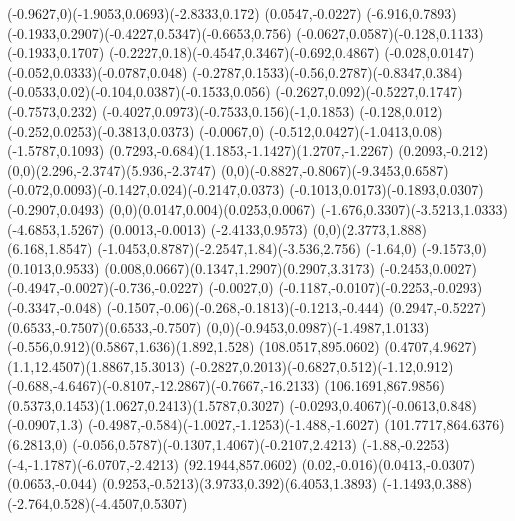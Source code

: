 {    \rcurveto(-0.9627,0)(-1.9053,0.0693)(-2.8333,0.172)
    \rlineto(0.0547,-0.0227)
    \rlineto(-6.916,0.7893)
    \rcurveto(-0.1933,0.2907)(-0.4227,0.5347)(-0.6653,0.756)
    \rcurveto(-0.0627,0.0587)(-0.128,0.1133)(-0.1933,0.1707)
    \rcurveto(-0.2227,0.18)(-0.4547,0.3467)(-0.692,0.4867)
    \rcurveto(-0.028,0.0147)(-0.052,0.0333)(-0.0787,0.048)
    \rcurveto(-0.2787,0.1533)(-0.56,0.2787)(-0.8347,0.384)
    \rcurveto(-0.0533,0.02)(-0.104,0.0387)(-0.1533,0.056)
    \rcurveto(-0.2627,0.092)(-0.5227,0.1747)(-0.7573,0.232)
    \rcurveto(-0.4027,0.0973)(-0.7533,0.156)(-1,0.1853)
    \rcurveto(-0.128,0.012)(-0.252,0.0253)(-0.3813,0.0373)
    \rlineto(-0.0067,0)
    \rcurveto(-0.512,0.0427)(-1.0413,0.08)(-1.5787,0.1093)
    \rcurveto(0.7293,-0.684)(1.1853,-1.1427)(1.2707,-1.2267)
    \rlineto(0.2093,-0.212)
    \rcurveto(0,0)(2.296,-2.3747)(5.936,-2.3747)
    \rcurveto(0,0)(-0.8827,-0.8067)(-9.3453,0.6587)
    \rcurveto(-0.072,0.0093)(-0.1427,0.024)(-0.2147,0.0373)
    \rcurveto(-0.1013,0.0173)(-0.1893,0.0307)(-0.2907,0.0493)
    \rcurveto(0,0)(0.0147,0.004)(0.0253,0.0067)
    \rcurveto(-1.676,0.3307)(-3.5213,1.0333)(-4.6853,1.5267)
    \rlineto(0.0013,-0.0013)
    \rlineto(-2.4133,0.9573)
    \rcurveto(0,0)(2.3773,1.888)(6.168,1.8547)
    \rcurveto(-1.0453,0.8787)(-2.2547,1.84)(-3.536,2.756)
    \rlineto(-1.64,0)
    \rlineto(-9.1573,0)
    \rlineto(0.1013,0.9533)
    \rcurveto(0.008,0.0667)(0.1347,1.2907)(0.2907,3.3173)
    \rcurveto(-0.2453,0.0027)(-0.4947,-0.0027)(-0.736,-0.0227)
    \rlineto(-0.0027,0)
    \rcurveto(-0.1187,-0.0107)(-0.2253,-0.0293)(-0.3347,-0.048)
    \rcurveto(-0.1507,-0.06)(-0.268,-0.1813)(-0.1213,-0.444)
    \rcurveto(0.2947,-0.5227)(0.6533,-0.7507)(0.6533,-0.7507)
    \rcurveto(0,0)(-0.9453,0.0987)(-1.4987,1.0133)
    \rcurveto(-0.556,0.912)(0.5867,1.636)(1.892,1.528)
    \moveto(108.0517,895.0602)
    \rcurveto(0.4707,4.9627)(1.1,12.4507)(1.8867,15.3013)
    \rcurveto(-0.2827,0.2013)(-0.6827,0.512)(-1.12,0.912)
    \rcurveto(-0.688,-4.6467)(-0.8107,-12.2867)(-0.7667,-16.2133)
    \moveto(106.1691,867.9856)
    \rcurveto(0.5373,0.1453)(1.0627,0.2413)(1.5787,0.3027)
    \rcurveto(-0.0293,0.4067)(-0.0613,0.848)(-0.0907,1.3)
    \rcurveto(-0.4987,-0.584)(-1.0027,-1.1253)(-1.488,-1.6027)
    \moveto(101.7717,864.6376)
    \rlineto(6.2813,0)
    \rcurveto(-0.056,0.5787)(-0.1307,1.4067)(-0.2107,2.4213)
    \rcurveto(-1.88,-0.2253)(-4,-1.1787)(-6.0707,-2.4213)
    \moveto(92.1944,857.0602)
    \rcurveto(0.02,-0.016)(0.0413,-0.0307)(0.0653,-0.044)
    \rcurveto(0.9253,-0.5213)(3.9733,0.392)(6.4053,1.3893)
    \rcurveto(-1.1493,0.388)(-2.764,0.528)(-4.4507,0.5307)
}
